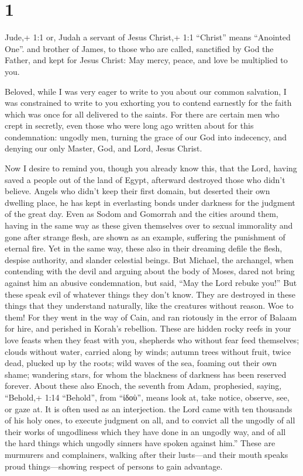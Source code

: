 \hypertarget{section}{%
\section{1}\label{section}}

 Jude,+ 1:1 or, Judah a servant of Jesus Christ,+ 1:1
``Christ'' means ``Anointed One''. and brother of James, to those who
are called, sanctified by God the Father, and kept for Jesus Christ:
 May mercy, peace, and love be multiplied to you.

 Beloved, while I was very eager to write to you about our
common salvation, I was constrained to write to you exhorting you to
contend earnestly for the faith which was once for all delivered to the
saints.  For there are certain men who crept in secretly,
even those who were long ago written about for this condemnation:
ungodly men, turning the grace of our God into indecency, and denying
our only Master, God, and Lord, Jesus Christ.

 Now I desire to remind you, though you already know this,
that the Lord, having saved a people out of the land of Egypt, afterward
destroyed those who didn't believe.  Angels who didn't keep
their first domain, but deserted their own dwelling place, he has kept
in everlasting bonds under darkness for the judgment of the great day.
 Even as Sodom and Gomorrah and the cities around them,
having in the same way as these given themselves over to sexual
immorality and gone after strange flesh, are shown as an example,
suffering the punishment of eternal fire.  Yet in the same
way, these also in their dreaming defile the flesh, despise authority,
and slander celestial beings.  But Michael, the archangel,
when contending with the devil and arguing about the body of Moses,
dared not bring against him an abusive condemnation, but said, ``May the
Lord rebuke you!''  But these speak evil of whatever things
they don't know. They are destroyed in these things that they understand
naturally, like the creatures without reason.  Woe to them!
For they went in the way of Cain, and ran riotously in the error of
Balaam for hire, and perished in Korah's rebellion.  These
are hidden rocky reefs in your love feasts when they feast with you,
shepherds who without fear feed themselves; clouds without water,
carried along by winds; autumn trees without fruit, twice dead, plucked
up by the roots;  wild waves of the sea, foaming out their
own shame; wandering stars, for whom the blackness of darkness has been
reserved forever.  About these also Enoch, the seventh from
Adam, prophesied, saying, ``Behold,+ 1:14 ``Behold'', from ``ἰδοὺ'',
means look at, take notice, observe, see, or gaze at. It is often used
as an interjection. the Lord came with ten thousands of his holy ones,
 to execute judgment on all, and to convict all the ungodly
of all their works of ungodliness which they have done in an ungodly
way, and of all the hard things which ungodly sinners have spoken
against him.''  These are murmurers and complainers,
walking after their lusts---and their mouth speaks proud
things---showing respect of persons to gain advantage.

